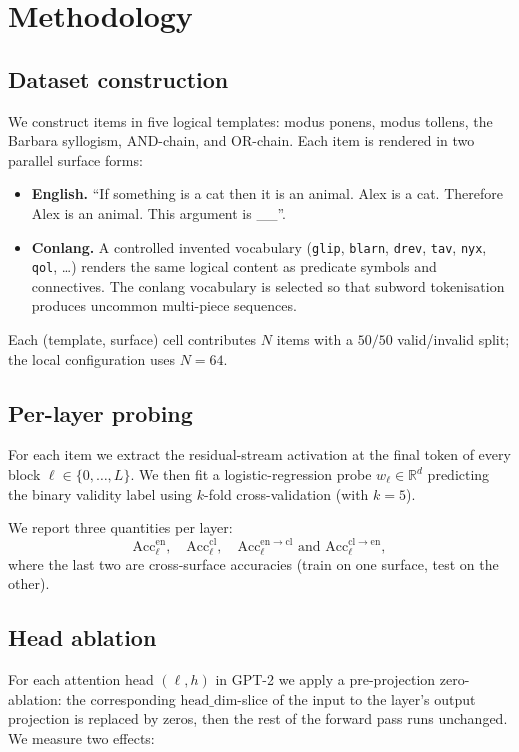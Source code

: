 \section{Methodology}

\subsection{Dataset construction}
We construct items in five logical templates: modus ponens, modus tollens,
the Barbara syllogism, AND-chain, and OR-chain. Each item is rendered in
two parallel surface forms:
\begin{itemize}
\item \textbf{English.} ``If something is a cat then it is an animal. Alex
is a cat. Therefore Alex is an animal. This argument is \_\_''.
\item \textbf{Conlang.} A controlled invented vocabulary
(\texttt{glip}, \texttt{blarn}, \texttt{drev}, \texttt{tav}, \texttt{nyx},
\texttt{qol}, \dots) renders the same logical content as predicate symbols
and connectives. The conlang vocabulary is selected so that subword
tokenisation produces uncommon multi-piece sequences.
\end{itemize}
Each (template, surface) cell contributes $N$ items with a $50/50$
valid/invalid split; the local configuration uses $N=64$.

\subsection{Per-layer probing}
For each item we extract the residual-stream activation at the
final token of every block $\ell \in \{0, \dots, L\}$. We then fit a
logistic-regression probe $w_\ell \in \mathbb{R}^d$ predicting the binary
validity label using $k$-fold cross-validation (with $k=5$).

We report three quantities per layer:
\[
\mathrm{Acc}_\ell^{\mathrm{en}}, \quad
\mathrm{Acc}_\ell^{\mathrm{cl}}, \quad
\mathrm{Acc}_\ell^{\mathrm{en}\to\mathrm{cl}} \text{ and } \mathrm{Acc}_\ell^{\mathrm{cl}\to\mathrm{en}},
\]
where the last two are cross-surface accuracies (train on one surface, test
on the other).

\subsection{Head ablation}
For each attention head $(\ell, h)$ in GPT-2 we apply a pre-projection
zero-ablation: the corresponding $\mathrm{head\_dim}$-slice of the input to
the layer's output projection is replaced by zeros, then the rest of the
forward pass runs unchanged. We measure two effects:

